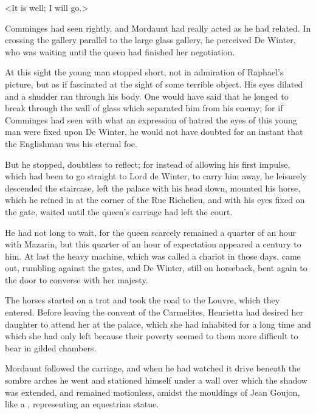 <It is well; I will go.>

Comminges had seen rightly, and Mordaunt had really acted as he had related. In crossing the gallery parallel to the large glass gallery, he perceived De Winter, who was waiting until the queen had finished her negotiation.

At this sight the young man stopped short, not in admiration of Raphael's picture, but as if fascinated at the sight of some terrible object. His eyes dilated and a shudder ran through his body. One would have said that he longed to break through the wall of glass which separated him from his enemy; for if Comminges had seen with what an expression of hatred the eyes of this young man were fixed upon De Winter, he would not have doubted for an instant that the Englishman was his eternal foe.

But he stopped, doubtless to reflect; for instead of allowing his first impulse, which had been to go straight to Lord de Winter, to carry him away, he leisurely descended the staircase, left the palace with his head down, mounted his horse, which he reined in at the corner of the Rue Richelieu, and with his eyes fixed on the gate, waited until the queen's carriage had left the court.

He had not long to wait, for the queen scarcely remained a quarter of an hour with Mazarin, but this quarter of an hour of expectation appeared a century to him. At last the heavy machine, which was called a chariot in those days, came out, rumbling against the gates, and De Winter, still on horseback, bent again to the door to converse with her majesty.

The horses started on a trot and took the road to the Louvre, which they entered. Before leaving the convent of the Carmelites, Henrietta had desired her daughter to attend her at the palace, which she had inhabited for a long time and which she had only left because their poverty seemed to them more difficult to bear in gilded chambers.

Mordaunt followed the carriage, and when he had watched it drive beneath the sombre arches he went and stationed himself under a wall over which the shadow was extended, and remained motionless, amidst the mouldings of Jean Goujon, like a , representing an equestrian statue. 